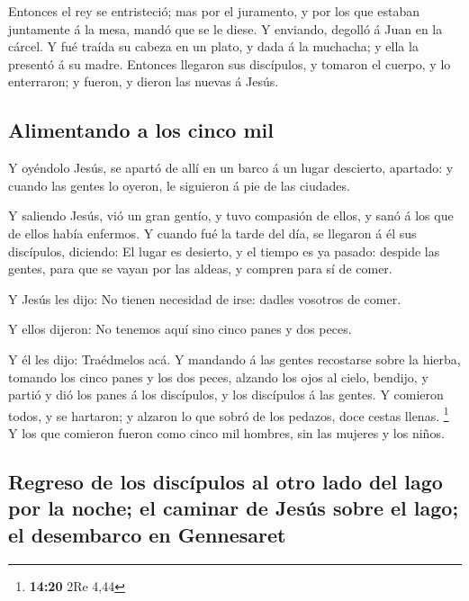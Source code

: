  Entonces el rey se entristeció; mas por el juramento, y por
los que estaban juntamente á la mesa, mandó que se le diese.
 Y enviando, degolló á Juan en la cárcel.  Y
fué traída su cabeza en un plato, y dada á la muchacha; y ella la
presentó á su madre.  Entonces llegaron sus discípulos, y
tomaron el cuerpo, y lo enterraron; y fueron, y dieron las nuevas á
Jesús.

\hypertarget{alimentando-a-los-cinco-mil}{%
\subsection{Alimentando a los cinco
mil}\label{alimentando-a-los-cinco-mil}}

 Y oyéndolo Jesús, se apartó de allí en un barco á un lugar
descierto, apartado: y cuando las gentes lo oyeron, le siguieron á pie
de las ciudades.

 Y saliendo Jesús, vió un gran gentío, y tuvo compasión de
ellos, y sanó á los que de ellos había enfermos.  Y cuando
fué la tarde del día, se llegaron á él sus discípulos, diciendo: El
lugar es desierto, y el tiempo es ya pasado: despide las gentes, para
que se vayan por las aldeas, y compren para sí de comer.

 Y Jesús les dijo: No tienen necesidad de irse: dadles
vosotros de comer.

 Y ellos dijeron: No tenemos aquí sino cinco panes y dos
peces.

 Y él les dijo: Traédmelos acá.  Y mandando á
las gentes recostarse sobre la hierba, tomando los cinco panes y los dos
peces, alzando los ojos al cielo, bendijo, y partió y dió los panes á
los discípulos, y los discípulos á las gentes.  Y comieron
todos, y se hartaron; y alzaron lo que sobró de los pedazos, doce cestas
llenas. \footnote{\textbf{14:20} 2Re 4,44}  Y los que
comieron fueron como cinco mil hombres, sin las mujeres y los niños.

\hypertarget{regreso-de-los-discuxedpulos-al-otro-lado-del-lago-por-la-noche-el-caminar-de-jesuxfas-sobre-el-lago-el-desembarco-en-gennesaret}{%
\subsection{Regreso de los discípulos al otro lado del lago por la
noche; el caminar de Jesús sobre el lago; el desembarco en
Gennesaret}\label{regreso-de-los-discuxedpulos-al-otro-lado-del-lago-por-la-noche-el-caminar-de-jesuxfas-sobre-el-lago-el-desembarco-en-gennesaret}}

